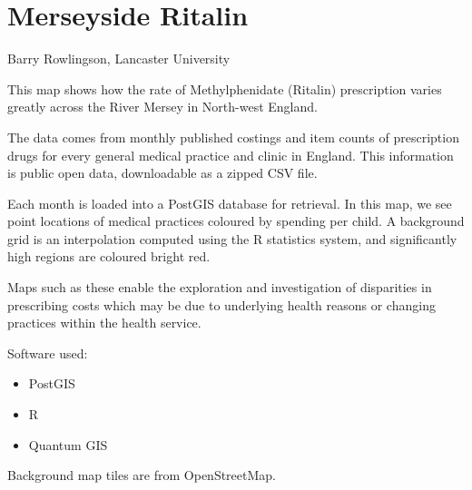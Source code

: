 
\section{Merseyside Ritalin}

Barry Rowlingson, Lancaster University

This map shows how the rate of Methylphenidate (Ritalin) prescription varies
greatly across the River Mersey in North-west England.

The data comes from monthly published costings and item counts of
prescription drugs for every general medical practice and clinic in 
England. This information is public open data, downloadable as a 
zipped CSV file.

Each month is loaded into a PostGIS database for retrieval. In this map,
we see point locations of medical practices coloured by spending per child.
A background grid is an interpolation computed using the R statistics system,
and significantly high regions are coloured bright red.

Maps such as these enable the exploration and investigation of disparities in
prescribing costs which may be due to underlying health reasons or changing
practices within the health service.

Software used:

\begin{itemize}
\item PostGIS 
\item R 
\item Quantum GIS 
\end{itemize}

Background map tiles are from OpenStreetMap. 

